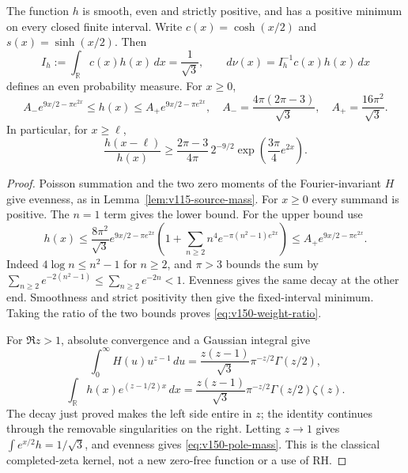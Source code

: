 \begin{lemma}
\label{lem:v150-weight}
The function $h$ is smooth, even and strictly positive, and has a positive
minimum on every closed finite interval. Write $c(x)=\cosh(x/2)$ and
$s(x)=\sinh(x/2)$. Then
\begin{equation}\label{eq:v150-pole-mass}
 I_h:=\int_{\mathbb R}c(x)h(x)\,dx=\frac1{\sqrt3},
 \qquad d\nu(x)=I_h^{-1}c(x)h(x)\,dx
\end{equation}
defines an even probability measure. For $x\ge0$,
\begin{equation}\label{eq:v150-weight-bounds}
 A_-e^{9x/2-\pi e^{2x}}\le h(x)\le A_+e^{9x/2-\pi e^{2x}},
 \quad A_-=\frac{4\pi(2\pi-3)}{\sqrt3},\quad
 A_+=\frac{16\pi^2}{\sqrt3}.
\end{equation}
In particular, for $x\ge\ell$,
\begin{equation}\label{eq:v150-weight-ratio}
 \frac{h(x-\ell)}{h(x)}\ge
 \frac{2\pi-3}{4\pi}\,2^{-9/2}
             \exp\!\left(\frac{3\pi}{4}e^{2x}\right).
\end{equation}
\end{lemma}
\begin{proof}
Poisson summation and the two zero moments of the Fourier-invariant
$H$ give evenness, as in Lemma~\ref{lem:v115-source-mass}.
For $x\ge0$ every summand is positive. The $n=1$ term gives the lower
bound. For the upper bound use
\[
 h(x)\le\frac{8\pi^2}{\sqrt3}e^{9x/2-\pi e^{2x}}
 \left(1+\sum_{n\ge2}n^4e^{-\pi(n^2-1)e^{2x}}\right)
 \le A_+e^{9x/2-\pi e^{2x}}.
\]
Indeed $4\log n\le n^2-1$ for $n\ge2$, and $\pi>3$ bounds the sum
by $\sum_{n\ge2}e^{-2(n^2-1)}\le\sum_{n\ge2}e^{-2n}<1$.
Evenness gives the same decay at the other end. Smoothness and strict
positivity then give the fixed-interval minimum. Taking the ratio of
the two bounds proves \eqref{eq:v150-weight-ratio}.

For $\Re z>1$, absolute convergence and a Gaussian integral give
\[
 \int_0^\infty H(u)u^{z-1}\,du
 =\frac{z(z-1)}{\sqrt3}\pi^{-z/2}\Gamma(z/2),
\]
\begin{equation}\label{eq:v150-mellin}
 \int_{\mathbb R}h(x)e^{(z-1/2)x}\,dx
 =\frac{z(z-1)}{\sqrt3}\pi^{-z/2}\Gamma(z/2)\zeta(z).
\end{equation}
The decay just proved makes the left side entire in $z$; the identity
continues through the removable singularities on the right. Letting
$z\to1$ gives $\int e^{x/2}h=1/\sqrt3$, and evenness gives
\eqref{eq:v150-pole-mass}. This is the classical completed-zeta kernel,
not a new zero-free function or a use of RH.
\end{proof}

